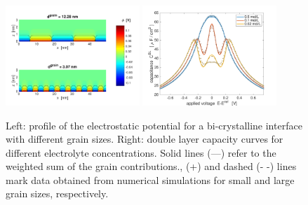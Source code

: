 \documentclass[a4paper,10pt]{article}
\begin{document}

\begin{figure}
  \centering
  \includegraphics[width=0.45\textwidth]{phi_poly2d_gran.pdf}
  \includegraphics[width=0.45\textwidth]{c_2d_grain.pdf}
  \caption{Left: profile of the electrostatic potential for a bi-crystalline interface with different
    grain sizes.
    Right: double layer capacity curves for different electrolyte concentrations.
    Solid lines (—) refer to the weighted sum of the grain contributions.,
    (+) and dashed (- -) lines mark data obtained from numerical simulations for
    small and large grain sizes, respectively.
 \label{fig:JES}}
\end{figure}
\end{document}
